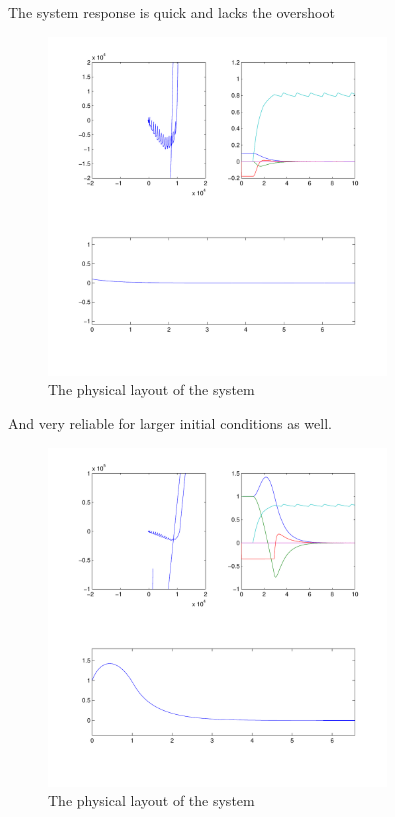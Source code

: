 The system response is quick and lacks the overshoot

\begin{figure}[H]
	\centering
	\includegraphics[width=0.8\textwidth]{img2/Sli01}
	\caption{The physical layout of the system}
	\label{fig:PhysicalLayout}
\end{figure}

And very reliable for larger initial conditions as well.

\begin{figure}[H]
	\centering
	\includegraphics[width=0.8\textwidth]{img2/Sli11}
	\caption{The physical layout of the system}
	\label{fig:PhysicalLayout}
\end{figure}

